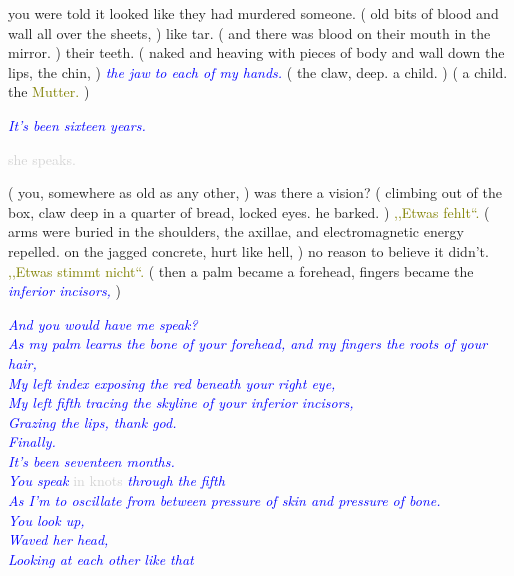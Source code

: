 \documentclass[11pt]{article}
\begin{document}
\begingroup
you were told it looked like they had murdered someone. ( old bits of blood and wall all over the sheets, ) like tar. ( and there was blood on their mouth in the mirror. ) their teeth. ( naked and heaving with pieces of body and wall down the lips, the chin, ) \textit{\textcolor{blue}{the jaw to each of my hands.}} ( the claw, deep.  a child. ) ( a child. the \textcolor{olive}{Mutter.} )
\endgroup

\begingroup
\begin{center}
\textit{\textcolor{blue}{It's been sixteen years.}}
\end{center}
\endgroup

\begingroup
\begin{center}
\textcolor{lightgray}{she speaks.}
\rightskip\leftskip
\end{center}
\endgroup

\begingroup
( you, somewhere as old as any other, ) was there a vision? ( climbing out of the box, claw deep in a quarter of bread, locked eyes. he barked. ) \textcolor{olive}{,,Etwas fehlt“.} ( arms were buried in the shoulders, the axillae, and electromagnetic energy repelled. on the jagged concrete, hurt like hell, ) no reason to believe it didn't. \textcolor{olive}{,,Etwas stimmt nicht“.} ( then a palm became a forehead, fingers became the \textit{\textcolor{blue}{inferior incisors,}} )
\endgroup

\begingroup
\begin{center}
\textit{\textcolor{blue}{And you would have me speak? \\ As my palm learns the bone of your forehead, and my fingers the roots of your hair, \\ My left index exposing the red beneath your right eye, \\ My left fifth tracing the skyline of your inferior incisors, \\ Grazing the lips, thank god. \\ Finally. \\ It's been seventeen months. \\ You speak}} \textcolor{lightgray}{in knots} \textit{\textcolor{blue}{through the fifth \\ As I'm to oscillate from between pressure of skin and pressure of bone. \\ You look up, \\ Waved her head, \\ Looking at each other like that } }
\end{center}
\endgroup
\end{document}
